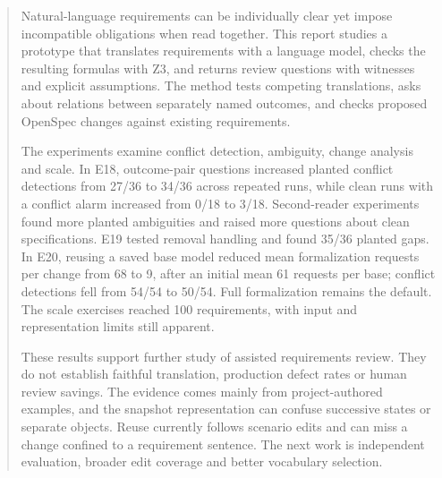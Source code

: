 \begin{abstract}
Natural-language requirements can be individually clear yet impose incompatible obligations when read together. This report studies a prototype that translates requirements with a language model, checks the resulting formulas with Z3, and returns review questions with witnesses and explicit assumptions. The method tests competing translations, asks about relations between separately named outcomes, and checks proposed OpenSpec changes against existing requirements.

The experiments examine conflict detection, ambiguity, change analysis and scale. In E18, outcome-pair questions increased planted conflict detections from 27/36 to 34/36 across repeated runs, while clean runs with a conflict alarm increased from 0/18 to 3/18. Second-reader experiments found more planted ambiguities and raised more questions about clean specifications. E19 tested removal handling and found 35/36 planted gaps. In E20, reusing a saved base model reduced mean formalization requests per change from 68 to 9, after an initial mean 61 requests per base; conflict detections fell from 54/54 to 50/54. Full formalization remains the default. The scale exercises reached 100 requirements, with input and representation limits still apparent.

These results support further study of assisted requirements review. They do not establish faithful translation, production defect rates or human review savings. The evidence comes mainly from project-authored examples, and the snapshot representation can confuse successive states or separate objects. Reuse currently follows scenario edits and can miss a change confined to a requirement sentence. The next work is independent evaluation, broader edit coverage and better vocabulary selection.
\end{abstract}
